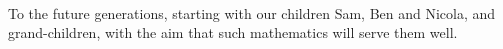 
\maketitle


\ \vfil
\begin{center}
\parbox{24em}{To the future generations, starting with our children Sam, Ben and Nicola, and grand-children, with the aim that such mathematics will serve them well.}
\end{center}


\begin{comment}
\addtocounter{page}{-1}
In this draft, the blue text comments such as this are notes to developers about related references, about reasons for decisions, about more exercises, about possible future extensions, and so on.
Such comments are not intended for the published version, they are only notes for myself and developers.


Outstanding tasks for a first version include:
\begin{itemize}
\item finalising the scope of the book and of applications;
\item exercises on computing that do not require a computer, e.g., interpretation;
\item potentially more applications that involve `real' data, especially in Chapter~5 on approximating matrices;
\item adapt information, especially some uses of the SVD, from the book by Mark Holmes (2016) ``Introduction to scientific computing and data analysis'' Springer;
\item possibly concept maps;
\item short videos of procedures, examples, proofs.
\end{itemize}

The following page is a test of how much one page of information of OUP's style corresponds to my typesetting here, from \emph{p.10 of 2.1 Monograph Design Royal 600wpp normal SAMPLE}. 
In 10pt this line length is a little shorter, but the page length is a little bigger.  Now adjusted textheight so nearly the same amount of info per page when in 10pt.

\newpage
Every year, thousands of students go to university to study for single or joint-honours  mathematics degrees. Many of these students are extremely intelligent and hardworking.  However, even the best struggle with the demands of making the transition to advanced  mathematics. Some struggles are down to adjusting to independent study and to learning  from lectures. Others, however, are more fundamental: the mathematics shifts in focus  from calculation to proof, and students are thus expected to interact with it in different  ways. These changes need not be mysterious---mathematics education research has  revealed many insights into the adjustments that are necessary---but they are not obvious  and they do need explaining.  


\end{comment}
